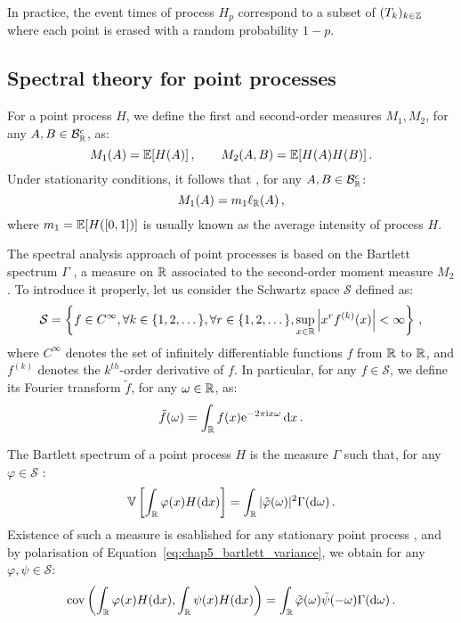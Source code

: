 In practice, the event times of process $H_p$ correspond to a subset of $(T_k)_{k\in{\mathbb Z}}$ where each point
is erased with a random probability $1-p$. 

\subsection{Spectral theory for point processes}\label{sec:chap5_spectral_theory}

For a point process $H$, we define the first and second-order measures $M_1, M_2$, for any $A, B\in\mathcal{B}_{{\mathbb R}}^c$, as:
\[M_1(A) = {\mathbb E}[H(A)]\,,\qquad M_2(A,B) = {\mathbb E}[H(A)H(B)]\,.\]
Under stationarity conditions, it follows that \parencite[Proposition 8.1.I]{DaleyV1}, for any $A, B\in\mathcal{B}_{{\mathbb R}}^c$:
\[M_1(A) = m_1 \ell_{{\mathbb R}}(A)\,,\]
where $m_1 = {\mathbb E}[H([0,1])]$ is usually known as the average intensity of process $H$.

The spectral analysis approach of point processes is based on the Bartlett spectrum $\Gamma$ \parencite{Bartlett1963}, 
a measure on ${\mathbb R}$ associated to the second-order moment measure $M_2$. 
To introduce it properly, let us consider the Schwartz space $\mathcal{S}$ defined as:
\[
    \mathcal S = \left\{ f \in C^\infty, \forall k \in \{1, 2, \dots\}, \forall r \in \{1, 2, \dots\},
    \sup_{x \in {\mathbb R}} \left| x^r
    f^{(k)}(x)
    \right| < \infty \right\}\,,
\] where $C^\infty$ denotes the set of infinitely differentiable functions $f$ from ${\mathbb R}$ to ${\mathbb R}$, 
and $f^{(k)}$ denotes the $k^{th}$-order derivative of $f$.
In particular, for any $f\in\mathcal{S}$, we define its Fourier transform $\tilde f$, for any $\omega\in{\mathbb R}$, as:
\[\tilde f (\omega) = \int_{{\mathbb R}}{f(x) \mathrm{e}^{-2\pi\mathrm{i} x \omega}\,{\mathrm{d}} x}\,.\]

The Bartlett spectrum of a point process $H$ is the measure $\Gamma$ such that, 
for any $\varphi\in\mathcal{S}$ \parencite[Definition 2]{Bremaud2005}:
\begin{equation}\label{eq:chap5_bartlett_variance}
    {\mathbb V}\left[\int_{{\mathbb R}}{\varphi(x)H({\mathrm{d}} x)}\right] = \int_{{\mathbb R}}{|\tilde\varphi(\omega)|^2\Gamma({\mathrm{d}} \omega)}\,.
\end{equation}
Existence of such a measure is esablished for any stationary point process \parencite[Proposition 8.2.I.(a)]{DaleyV1},
and by polarisation of Equation~\eqref{eq:chap5_bartlett_variance}, we obtain for any $\varphi, \psi \in \mathcal{S}$:
\begin{equation}\label{eq:chap5_bartlett_covariance}
    \operatorname{cov}\left(\int_{{\mathbb R}}{\varphi(x)H({\mathrm{d}} x)}, \int_{{\mathbb R}}{\psi(x)H({\mathrm{d}} x)}\right) = \int_{{\mathbb R}}{\tilde \varphi(\omega)\tilde \psi(-\omega)\Gamma({\mathrm{d}} \omega)}\,.
\end{equation}

